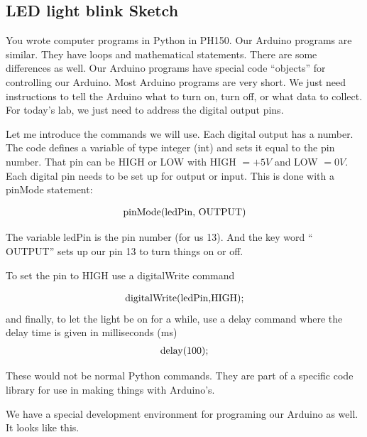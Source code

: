 \subsection{LED light blink Sketch}

You wrote computer programs in Python in PH150. Our Arduino programs are similar. They have loops and mathematical statements. There are some differences as well. Our Arduino programs have special code ``objects'' for controlling our Arduino. Most Arduino programs are very short. We just need instructions to tell the Arduino what to turn on, turn off, or what data to collect. For today's lab, we just need to address the digital output pins.

Let me introduce the commands we will use. Each digital output has a number. The code defines a variable of type integer (int) and sets it equal to the pin number. That pin can be HIGH or LOW with HIGH $=+5\unit{V}$ and LOW $=0\unit{V}$. Each digital pin needs to be set up for output or input. This is done with a pinMode statement:

\begin{equation*}
	\begin{tabular}{l}
		pinMode(ledPin, OUTPUT)
	\end{tabular}
\end{equation*}

The variable ledPin is the pin number (for us 13). And the key word `` OUTPUT'' sets up our pin 13 to turn things on or off.

To set the pin to HIGH use a digitalWrite command

\begin{equation*}
	\begin{tabular}{l}
		digitalWrite(ledPin,HIGH);
	\end{tabular}
\end{equation*}
and finally, to let the light be on for a while, use a delay command where
the delay time is given in milliseconds (ms)%
\begin{equation*}
	\begin{tabular}{l}
		delay(100);
	\end{tabular}
\end{equation*}

These would not be normal Python commands. They are part of a specific code library for use in making things with Arduino's.

We have a special development environment for programing our Arduino as well. It looks like this. 

